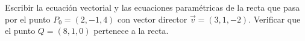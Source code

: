 Escribir la ecuación vectorial y las ecuaciones paramétricas de la recta que pasa por el punto $P_0 = (2, -1, 4)$ con vector director $\vec{v} = (3, 1, -2)$. Verificar que el punto $Q = (8, 1, 0)$ pertenece a la recta.